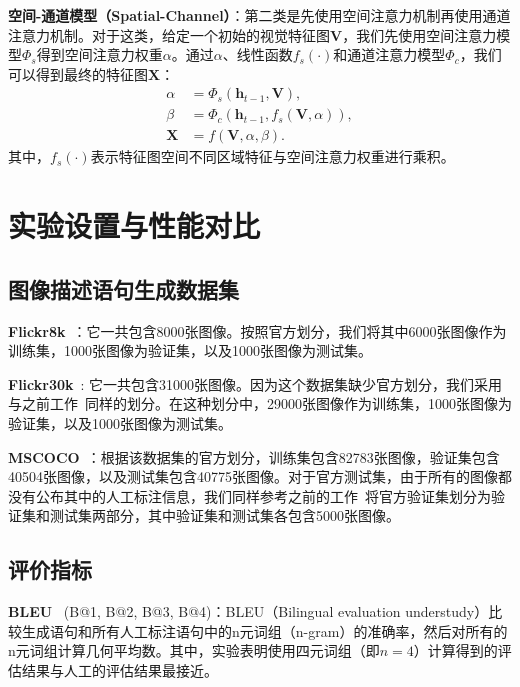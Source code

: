 \textbf{空间-通道模型（Spatial-Channel）}：第二类是先使用空间注意力机制再使用通道注意力机制。对于这类，给定一个初始的视觉特征图$\mathbf{V}$，我们先使用空间注意力模型$\Phi_s$得到空间注意力权重$\alpha$。通过$\alpha$、线性函数$f_s(\cdot)$和通道注意力模型$\Phi_c$，我们可以得到最终的特征图$\mathbf{X}$：
\begin{equation} \label{ch5:eq:eq_9}
\begin{split}
\alpha &= \Phi_s \left(\mathbf{h}_{t-1}, \mathbf{V} \right), \\
\beta &= \Phi_c \left(\mathbf{h}_{t-1}, f_s \left(\mathbf{V}, \alpha \right) \right), \\
\mathbf{X} &= f \left(\mathbf{V}, \alpha, \beta \right).
\end{split}
\end{equation}
其中，$f_s(\cdot)$表示特征图空间不同区域特征与空间注意力权重进行乘积。



\section{实验设置与性能对比}
\subsection{图像描述语句生成数据集}
\noindent\textbf{Flickr8k}~\cite{hodosh2013framing}：它一共包含8000张图像。按照官方划分，我们将其中6000张图像作为训练集，1000张图像为验证集，以及1000张图像为测试集。

\noindent\textbf{Flickr30k}~\cite{young2014image}: 它一共包含31000张图像。因为这个数据集缺少官方划分，我们采用与之前工作~\cite{karpathy2015deep}同样的划分。在这种划分中，29000张图像作为训练集，1000张图像为验证集，以及1000张图像为测试集。

\noindent\textbf{MSCOCO}~\cite{lin2014microsoft}：根据该数据集的官方划分，训练集包含82783张图像，验证集包含40504张图像，以及测试集包含40775张图像。对于官方测试集，由于所有的图像都没有公布其中的人工标注信息，我们同样参考之前的工作~\cite{karpathy2015deep}将官方验证集划分为验证集和测试集两部分，其中验证集和测试集各包含5000张图像。


\subsection{评价指标}
\noindent\textbf{BLEU}~\cite{papineni2002bleu} (B@1, B@2, B@3, B@4)：BLEU（Bilingual evaluation understudy）比较生成语句和所有人工标注语句中的n元词组（n-gram）的准确率，然后对所有的n元词组计算几何平均数。其中，实验表明使用四元词组（即$n=4$）计算得到的评估结果与人工的评估结果最接近。

